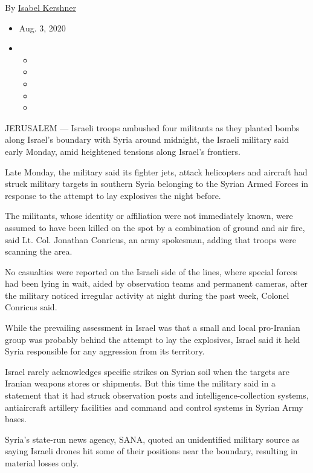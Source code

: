 By \href{https://www.nytimes3xbfgragh.onion/by/isabel-kershner}{Isabel
Kershner}

\begin{itemize}
\item
  Aug. 3, 2020
\item
  \begin{itemize}
  \item
  \item
  \item
  \item
  \item
  \end{itemize}
\end{itemize}

JERUSALEM --- Israeli troops ambushed four militants as they planted
bombs along Israel's boundary with Syria around midnight, the Israeli
military said early Monday, amid heightened tensions along Israel's
frontiers.

Late Monday, the military said its fighter jets, attack helicopters and
aircraft had struck military targets in southern Syria belonging to the
Syrian Armed Forces in response to the attempt to lay explosives the
night before.

The militants, whose identity or affiliation were not immediately known,
were assumed to have been killed on the spot by a combination of ground
and air fire, said Lt. Col. Jonathan Conricus, an army spokesman, adding
that troops were scanning the area.

No casualties were reported on the Israeli side of the lines, where
special forces had been lying in wait, aided by observation teams and
permanent cameras, after the military noticed irregular activity at
night during the past week, Colonel Conricus said.

While the prevailing assessment in Israel was that a small and local
pro-Iranian group was probably behind the attempt to lay the explosives,
Israel said it held Syria responsible for any aggression from its
territory.

Israel rarely acknowledges specific strikes on Syrian soil when the
targets are Iranian weapons stores or shipments. But this time the
military said in a statement that it had struck observation posts and
intelligence-collection systems, antiaircraft artillery facilities and
command and control systems in Syrian Army bases.

Syria's state-run news agency, SANA, quoted an unidentified military
source as saying Israeli drones hit some of their positions near the
boundary, resulting in material losses only.

